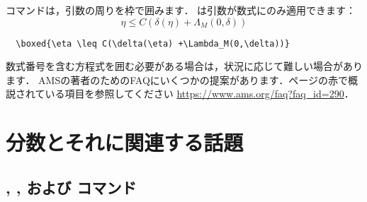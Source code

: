コマンドは，引数の周りを枠で囲みます．
は引数が数式にのみ適用できます：
\begin{equation}
\boxed{\eta \leq C(\delta(\eta) +\Lambda_M(0,\delta))}
\end{equation}
\begin{verbatim}
  \boxed{\eta \leq C(\delta(\eta) +\Lambda_M(0,\delta))}
\end{verbatim}
数式番号を含む方程式を囲む必要がある場合は，状況に応じて難しい場合があります．
AMSの著者のためのFAQにいくつかの提案があります．ページの赤で概説されている項目を参照してください
\url{https://www.ams.org/faq?faq_id=290}．



\section{分数とそれに関連する話題}

\subsection{, , および
  コマンド}

